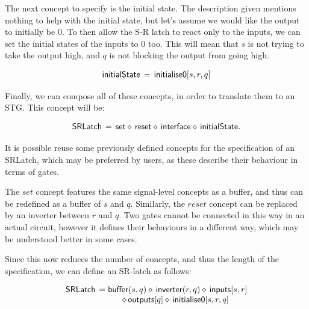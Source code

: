 \documentclass[british,conference,compsoc]{IEEEtran}
\begin{document}
\noindent The next concept to specify is the initial state. The description given mentions nothing
to help with the initial state, but let's assume we would like the output to initially be 0. 
To then allow the S-R latch to react only to the inputs, we can set the initial states of the 
inputs to 0 too. This will mean that $s$ is not trying to take the output high, and $q$ is not
blocking the output from going high. 

\[
\begin{array}{lcl}
\mathsf{initialState}&\hspace{-2mm}=&\hspace{-2mm}\mathsf{initialise0} [s, r, q]
\end{array}
\]

\noindent Finally, we can compose all of these concepts, in order to translate them to an STG. This concept will be:


\[
\begin{array}{lcl}
\mathsf{SRLatch}&\hspace{-2mm}=&\hspace{-2mm}\mathsf{set} \diamond\, \mathsf{reset} \diamond\, \mathsf{interface} 
\diamond\, \mathsf{initialState}.
\end{array}
\]

\noindent It is possible reuse some previously defined concepts for the specification of an SRLatch,
which may be preferred by users, as these describe their behaviour in terms of gates.  

The $set$ concept features the same signal-level concepts as a buffer, and thus can be redefined
as a buffer of $s$ and $q$. Similarly, the $reset$ concept can be replaced by an inverter between
$r$ and $q$. Two gates cannot be connected in this way in an actual circuit, however
it defines their behaviours in a different way, which may be understood better in some cases.

Since this now reduces the number of concepts, and thus the length of the specification, we
can define an SR-latch as follows:


 \[
\begin{array}{lcl}
\mathsf{SRLatch}&\hspace{-2mm}=\mathsf{buffer}(s, q) \diamond\, \mathsf{inverter}(r, q) \diamond\, \mathsf{inputs}[s, r]\\ 
&\diamond\, \mathsf{outputs}[q] \diamond\, \mathsf{initialise0} [s, r, q]
\end{array}
\]
\end{document}
